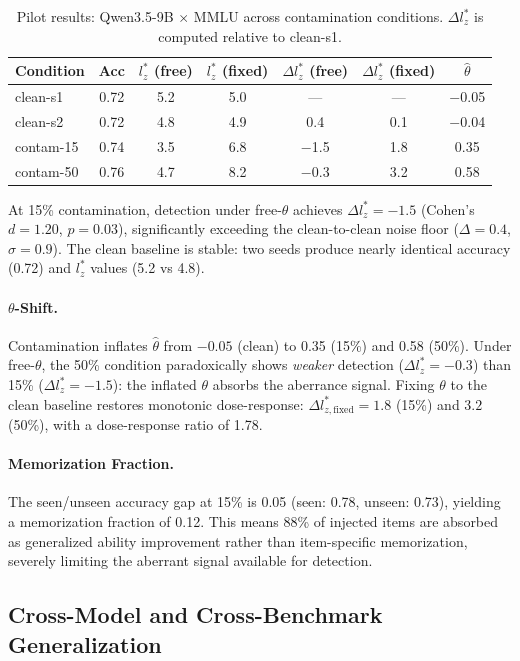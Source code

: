 \documentclass[11pt]{article}
\begin{document}
\begin{table}[h]
\centering
\caption{Pilot results: Qwen3.5-9B $\times$ MMLU across contamination conditions. $\Delta l_z^*$ is computed relative to clean-s1.}
\label{tab:pilot}
\begin{tabular}{lcccccc}
\toprule
Condition & Acc & $l_z^*$ (free) & $l_z^*$ (fixed) & $\Delta l_z^*$ (free) & $\Delta l_z^*$ (fixed) & $\hat{\theta}$ \\
\midrule
clean-s1 & 0.72 & 5.2 & 5.0 & --- & --- & $-$0.05 \\
clean-s2 & 0.72 & 4.8 & 4.9 & 0.4 & 0.1 & $-$0.04 \\
contam-15 & 0.74 & 3.5 & 6.8 & $-$1.5 & 1.8 & 0.35 \\
contam-50 & 0.76 & 4.7 & 8.2 & $-$0.3 & 3.2 & 0.58 \\
\bottomrule
\end{tabular}
\end{table}

At 15\% contamination, detection under free-$\theta$ achieves $\Delta l_z^* = -1.5$ (Cohen's $d = 1.20$, $p = 0.03$), significantly exceeding the clean-to-clean noise floor ($\Delta = 0.4$, $\sigma = 0.9$). The clean baseline is stable: two seeds produce nearly identical accuracy (0.72) and $l_z^*$ values (5.2 vs 4.8).

\paragraph{$\theta$-Shift.} Contamination inflates $\hat{\theta}$ from $-0.05$ (clean) to 0.35 (15\%) and 0.58 (50\%). Under free-$\theta$, the 50\% condition paradoxically shows \emph{weaker} detection ($\Delta l_z^* = -0.3$) than 15\% ($\Delta l_z^* = -1.5$): the inflated $\theta$ absorbs the aberrance signal. Fixing $\theta$ to the clean baseline restores monotonic dose-response: $\Delta l_{z,\text{fixed}}^{*} = 1.8$ (15\%) and $3.2$ (50\%), with a dose-response ratio of 1.78.

\paragraph{Memorization Fraction.} The seen/unseen accuracy gap at 15\% is 0.05 (seen: 0.78, unseen: 0.73), yielding a memorization fraction of 0.12. This means 88\% of injected items are absorbed as generalized ability improvement rather than item-specific memorization, severely limiting the aberrant signal available for detection.

\subsection{Cross-Model and Cross-Benchmark Generalization}
\label{sec:full_experiment}
\end{document}
